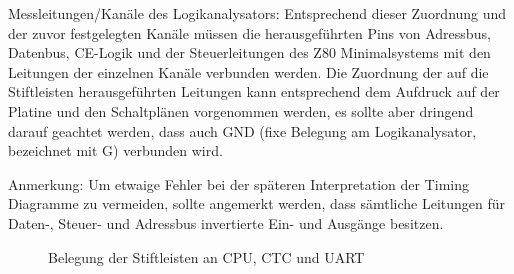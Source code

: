 Messleitungen/Kanäle des Logikanalysators:
Entsprechend dieser Zuordnung und der zuvor festgelegten Kanäle müssen die herausgeführten Pins von Adressbus, Datenbus, CE-Logik und der Steuerleitungen des Z80 Minimalsystems mit den Leitungen der einzelnen Kanäle verbunden werden. Die Zuordnung der auf die Stiftleisten herausgeführten Leitungen kann entsprechend dem Aufdruck auf der Platine und den Schaltplänen vorgenommen werden, es sollte aber dringend darauf geachtet werden, dass auch GND (fixe Belegung am Logikanalysator, bezeichnet mit G) verbunden wird.

\begin{warning}
    Anmerkung: Um etwaige Fehler bei der späteren Interpretation der Timing Diagramme zu vermeiden, sollte angemerkt werden, dass sämtliche Leitungen für Daten-, Steuer- und Adressbus invertierte Ein- und Ausgänge besitzen.
\end{warning}
\begin{figure}[H]
    \centering
    \qquad
    \qquad
    \qquad
    \caption[Z80 Belegung der Stiftleisten an CPU, CTC und UART]{Belegung der Stiftleisten an CPU, CTC und UART}
    \label{fig:z80-stiftleiste}
\end{figure}
